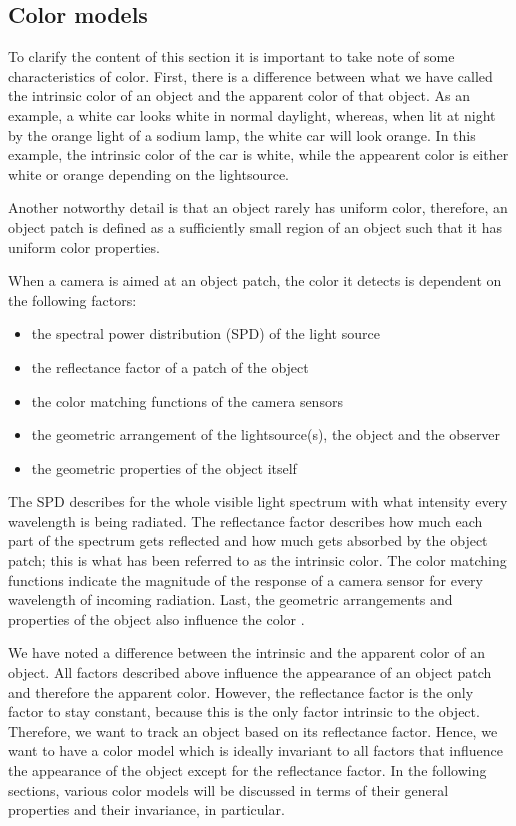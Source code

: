 \documentclass[a4paper,11pt]{article}
\begin{document}
\subsection{Color models}

To clarify the content of this section it is important to take note of some characteristics of color. First, there is a difference between what we have called the intrinsic color of an object and the apparent color of that object. As an example, a white car looks white in normal daylight, whereas, when lit at night by the orange light of a sodium lamp, the white car will look orange. In this example, the intrinsic color of the car is white, while the appearent color is either white or orange depending on the lightsource.

Another notworthy detail is that an object rarely has uniform color, therefore, an object patch is defined as a sufficiently small region of an object such that it has uniform color properties. 

When a camera is aimed at an object patch, the color it detects is dependent on the following factors: 
\begin{itemize}
\item the spectral power distribution (SPD) of the light source
\item the reflectance factor of a patch of the object
\item the color matching functions of the camera sensors 
\item the geometric arrangement of the lightsource(s), the object and the observer
\item the geometric properties of the object itself
\end{itemize}
The SPD describes for the whole visible light spectrum with what intensity every wavelength is being radiated. The reflectance factor describes how much each part of the spectrum gets reflected and how much gets absorbed by the object patch; this is what has been referred to as the intrinsic color. The color matching functions indicate the magnitude of the response of a camera sensor for every wavelength of incoming radiation. Last, the geometric arrangements and properties of the object also influence the color \cite{gevers_color}.

We have noted a difference between the intrinsic and the apparent color of an object. All factors described above influence the appearance of an object patch and therefore the apparent color. However, the reflectance factor is the only factor to stay constant, because this is the only factor intrinsic to the object. Therefore, we want to track an object based on its reflectance factor. Hence, we want to have a color model which is ideally invariant to all factors that influence the appearance of the object except for the reflectance factor. In the following sections, various color models will be discussed in terms of their general properties and their invariance, in particular. 
\end{document}
